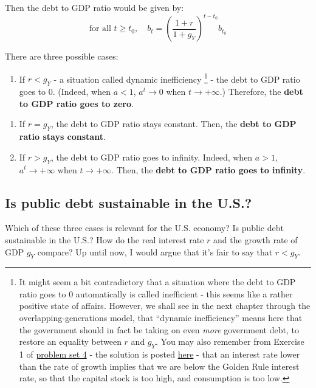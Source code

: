 \documentclass[]{book}
\providecommand{\tightlist}{%
  \setlength{\itemsep}{0pt}\setlength{\parskip}{0pt}}
\let\rmarkdownfootnote\footnote%
\def\footnote{\protect\rmarkdownfootnote}
\theoremstyle{definition}
\theoremstyle{definition}
\theoremstyle{definition}
\theoremstyle{remark}
\begin{document}
Then the debt to GDP ratio would be given by:
\[\boxed{\text{for all }t\geq t_{0},\quad b_t=\left(\frac{1+r}{1+g_Y}\right)^{t-t_{0}}b_{t_0}}\]

There are three possible cases:

\begin{enumerate}
\def\labelenumi{\arabic{enumi}.}
\tightlist
\item
  If \(r<g_Y\) - a situation called dynamic inefficiency \footnote{It
    might seem a bit contradictory that a situation where the debt to
    GDP ratio goes to 0 automatically is called inefficient - this seems
    like a rather positive state of affairs. However, we shall see in
    the next chapter through the overlapping-generations model, that
    ``dynamic inefficiency'' means here that the government should in
    fact be taking on even \emph{more} government debt, to restore an
    equality between \(r\) and \(g_Y\). You may also remember from
    Exercise 1 of \href{pset4.html}{problem set 4} - the solution is
    posted \href{pset4-sol.html}{here} - that an interest rate lower
    than the rate of growth implies that we are below the Golden Rule
    interest rate, so that the capital stock is too high, and
    consumption is too low.} - the debt to GDP ratio goes to 0. (Indeed,
  when \(a<1\), \(a^{t}\to 0\) when \(t \to +\infty\).) Therefore, the
  \textbf{debt to GDP ratio goes to zero}.
\end{enumerate}

\begin{enumerate}
\def\labelenumi{\arabic{enumi}.}
\setcounter{enumi}{1}
\item
  If \(r=g_Y\), the debt to GDP ratio stays constant. Then, the
  \textbf{debt to GDP ratio stays constant}.
\item
  If \(r>g_Y\), the debt to GDP ratio goes to infinity. Indeed, when
  \(a>1\), \(a^{t}\to+\infty\) when \(t \to +\infty\). Then, the
  \textbf{debt to GDP ratio goes to infinity}.
\end{enumerate}

\subsection{Is public debt sustainable in the
U.S.?}\label{is-public-debt-sustainable-in-the-u.s.}

Which of these three cases is relevant for the U.S. economy? Is public
debt sustainable in the U.S.? How do the real interest rate \(r\) and
the growth rate of GDP \(g_Y\) compare? Up until now, I would argue that
it's fair to say that \(r<g_Y\).
\end{document}

